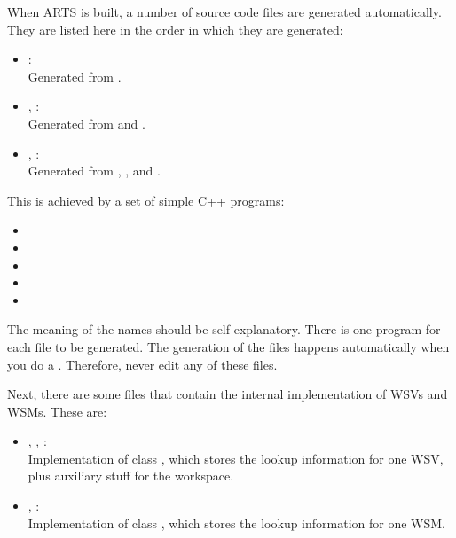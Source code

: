 \vspace{2ex}
When ARTS is built, a number of source code files are generated
automatically. They are listed here in the order in which they are
generated: 
\begin{itemize}
\item {}:\\
  Generated from .
\item {}, :\\
  Generated from  and . 
\item {}, :\\
  Generated from ,
  , and .
\end{itemize}
This is achieved by a set of simple C++ programs:
\begin{itemize}
\item {}
\item {}
\item {}
\item {}
\item {}
\end{itemize}
The meaning of the names should be self-explanatory. There is one program
for each file to be generated.  The generation of the
 files happens automatically when you do a
. Therefore, never edit any of these files.

Next, there are some files that contain the internal implementation
of WSVs and WSMs. These are:
\begin{itemize}
\item {}, ,
  :\\
  Implementation of class
  , which stores the lookup information for one
  WSV, plus auxiliary stuff for the workspace.
\item {}, :\\
  Implementation of class , which stores the
  lookup information for one WSM.
\end{itemize}

